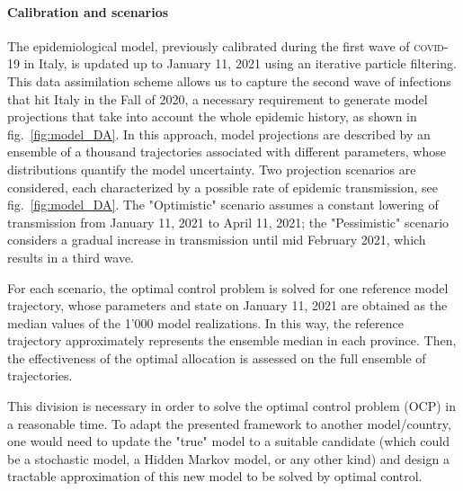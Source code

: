 \paragraph{Calibration and scenarios}The epidemiological model, previously calibrated during the first wave of \textsc{covid}-19 in Italy, is updated up to January 11, 2021 using an iterative particle filtering. This data assimilation scheme allows us to capture the second wave of infections that hit Italy in the Fall of 2020, a necessary requirement to generate model projections that take into account the whole epidemic history, as shown in fig.~\ref{fig:model_DA}. In this approach, model projections are described by an ensemble of a thousand trajectories associated with different parameters, whose distributions quantify the model uncertainty. 
Two projection scenarios are considered, each characterized by a possible rate of epidemic transmission, see fig.~\ref{fig:model_DA}. The "Optimistic" scenario assumes a constant lowering of transmission from January 11, 2021 to April 11, 2021; the "Pessimistic" scenario considers a gradual increase in transmission until mid February 2021, which results in a third wave. 

For each scenario, the optimal control problem is solved for one reference model trajectory, whose parameters and state on January 11, 2021 are obtained as the median values of the 1'000 model realizations. In this way, the reference trajectory approximately represents the ensemble median in each province. Then, the effectiveness of the optimal allocation is assessed on the full ensemble of trajectories.



This division is necessary in order to solve the optimal control problem (OCP) in a reasonable time. To adapt the presented framework to another model/country, one would need to update the "true" model to a suitable candidate (which could be a stochastic model, a Hidden Markov model, or any other kind) and design a tractable approximation of this new model to be solved by optimal control.

